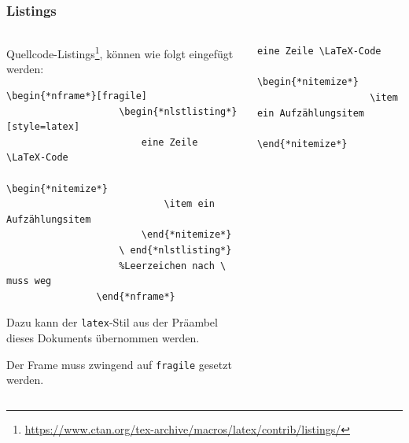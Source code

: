 \documentclass[german,notoc,draft]{tudbeamer}%
\begin{document}
\begin{frame}[fragile]
	\frametitle{Listings}

	\begin{columns}[T,onlytextwidth]
		\begin{column}{.475\textwidth}
			Quellcode-Listings\footnote[frame]{\url{https://www.ctan.org/tex-archive/macros/latex/contrib/listings/}}, können wie folgt eingefügt werden:
			\begin{lstlisting}[gobble=8,style=latex,mathescape]
				\begin{*nframe*}[fragile]
					\begin{*nlstlisting*}[style=latex]
						eine Zeile \LaTeX-Code
						\begin{*nitemize*}
							\item ein Aufzählungsitem
						\end{*nitemize*}
					\ end{*nlstlisting*}
					%Leerzeichen nach \ muss weg
				\end{*nframe*}
			\end{lstlisting}
			Dazu kann der \texttt{latex}-Stil aus der Präambel dieses Dokuments übernommen werden.

			Der Frame muss zwingend auf \texttt{fragile} gesetzt werden.
		\end{column}
		\begin{column}{.475\textwidth}			
			\begin{lstlisting}[gobble=8,style=latex]
				eine Zeile \LaTeX-Code
				\begin{*nitemize*}
					\item ein Aufzählungsitem
				\end{*nitemize*}
			\end{lstlisting}
		\end{column}
	\end{columns}
\end{frame}
\end{document}
